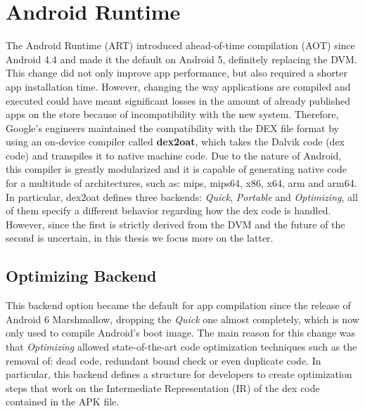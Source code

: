 \section{Android Runtime}
The Android Runtime (ART) introduced ahead-of-time compilation (AOT) since Android 4.4 and made it the default on Android 5, definitely replacing  the DVM. This change did not only improve app performance, but also required a shorter app installation time. However, changing the way applications are compiled and executed could have meant significant losses in the amount of already published apps on the store because of incompatibility with the new system. Therefore, Google's engineers maintained the compatibility with the DEX file format by using an on-device compiler called \textbf{dex2oat}, which takes the Dalvik code (dex code) and transpiles it to native machine code. Due to the nature of Android, this compiler is greatly modularized and it is capable of generating native code for a multitude of architectures, such as: mips, mips64, x86, x64, arm and arm64. In particular, dex2oat defines three backends: \emph{Quick}, \emph{Portable} and \emph{Optimizing}, all of them specify a different behavior regarding how the dex code is handled. However, since the first is strictly derived from the DVM and the future of the second is uncertain\cite{artist}, in this thesis we focus more on the latter. 

\subsection{Optimizing Backend}
This backend option became the default for app compilation since the release of Android 6 Marshmallow, dropping the \emph{Quick} one almost completely, which is now only used to compile Android's boot image. The main reason for this change was that \emph{Optimizing} allowed state-of-the-art code optimization techniques such as the removal of: dead code, redundant bound check or even duplicate code. In particular, this backend defines a structure for developers to create optimization steps that work on the Intermediate Representation (IR) of the dex code contained in the APK file.


